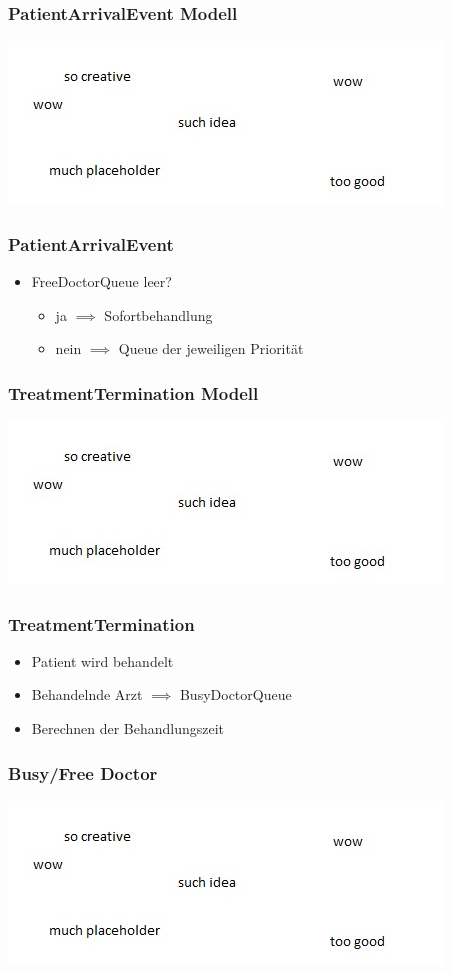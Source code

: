 \documentclass{beamer}
\begin{document}
\begin{frame}
	\frametitle{PatientArrivalEvent Modell}
	\includegraphics[scale=1]{img/patientArrivalEventModell.jpg}
\end{frame}

\begin{frame}
	\frametitle{PatientArrivalEvent}
	\begin{itemize}
		\item FreeDoctorQueue leer? 
		\begin{itemize}
			\item ja $\implies$ Sofortbehandlung
			\item nein $\implies$ Queue der jeweiligen Priorit\"{a}t
		\end{itemize}
	\end{itemize}
\end{frame}

\begin{frame}
	\frametitle{TreatmentTermination Modell}
	\includegraphics[scale=1]{img/treatmentTermination.jpg}
\end{frame}

\begin{frame}
	\frametitle{TreatmentTermination}
	\begin{itemize}
		\item Patient wird behandelt
		\item Behandelnde Arzt $\implies$ BusyDoctorQueue
		\item Berechnen der Behandlungszeit
	\end{itemize}
\end{frame}

\begin{frame}
	\frametitle{Busy/Free Doctor}
	\includegraphics[scale=1]{img/busyFreeDoctor.jpg}
\end{frame}
\end{document}
